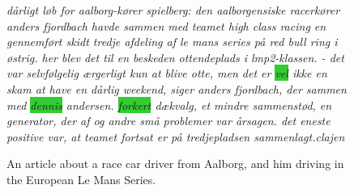 \begin{figure}
	\begin{tcolorbox}
		\emph{
			dårligt \colorbox{Peach}{løb} for aalborg-kører spielberg: den aalborgensiske racerkører anders fjordbach havde sammen med teamet high class racing en gennemført skidt \colorbox{Peach}{tredje} afdeling af  le mans series på red bull ring i østrig. her blev det til en beskeden ottendeplads i lmp2-klassen. - det var \colorbox{Peach}{selvfølgelig} ærgerligt kun at blive  otte, men det er \colorbox{LimeGreen}{vel} ikke en skam at have en dårlig weekend, siger anders fjordbach, der  sammen med \colorbox{LimeGreen}{dennis} andersen.  \colorbox{LimeGreen}{forkert} dækvalg, et \colorbox{Peach}{mindre} sammenstød, en generator, der  af og andre små problemer var årsagen. det \colorbox{Peach}{eneste} positive var, at teamet \colorbox{Peach}{fortsat} er på tredjepladsen sammenlagt.clajen
		}
	\end{tcolorbox}
	\caption{An article about a race car driver from Aalborg, and him driving in the European Le Mans Series.}
	\label{art:1}
\end{figure}

